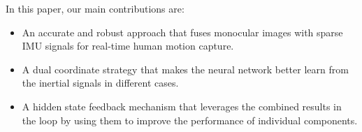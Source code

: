 %
%
%
%
%
%
%
%

%
%
%
%

In this paper, our main contributions are:
\begin{itemize}
    \item An accurate and robust approach that fuses monocular images with sparse IMU signals for real-time human motion capture.
    \item A dual coordinate strategy that makes the neural network better learn from the inertial signals in different cases.
    \item A hidden state feedback mechanism that leverages the combined results in the loop by using them to improve the performance of individual components.
\end{itemize}
%
%